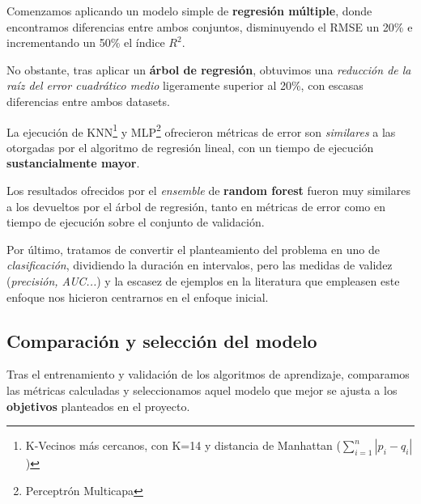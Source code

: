 Comenzamos aplicando un modelo simple de \textbf{regresión múltiple}, donde encontramos diferencias entre ambos conjuntos,  disminuyendo el RMSE un 20\% e incrementando un 50\% el índice $R^{2}$.

No obstante, tras aplicar un \textbf{árbol de regresión},  obtuvimos una \textit{reducción de la raíz del error cuadrático medio} ligeramente superior al 20\%, con escasas diferencias entre ambos datasets.


La ejecución de KNN\footnote{K-Vecinos más cercanos, con K=14 y distancia de Manhattan (\(\sum_{i=1}^{n} |p_{i} - q_{i}|\))} y MLP\footnote{Perceptrón Multicapa} ofrecieron métricas de error son \textit{similares} a las otorgadas por el algoritmo de regresión lineal, con un tiempo de ejecución \textbf{sustancialmente mayor}.

Los resultados ofrecidos por el \textit{ensemble} de \textbf{random forest} fueron muy similares a los devueltos por el árbol de regresión, tanto en métricas de error como en tiempo de ejecución sobre el conjunto de validación.

Por último, tratamos de convertir el planteamiento del problema en uno de \textit{clasificación}, dividiendo la duración en intervalos, pero las medidas de validez (\textit{precisión, AUC...}) y la escasez de ejemplos en la literatura que empleasen este enfoque nos hicieron centrarnos en el enfoque inicial.


\subsection{Comparación y selección del modelo}

Tras el entrenamiento y validación de los algoritmos de aprendizaje, comparamos las métricas calculadas y seleccionamos aquel modelo que mejor se ajusta a los \textbf{objetivos} planteados en el proyecto.


